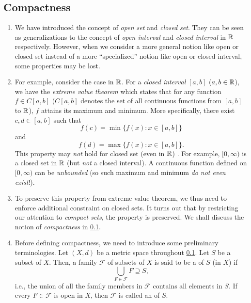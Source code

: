 \subsection{Compactness}
\label{subsect:compactness}
\begin{enumerate}
\item We have introduced the concept of \emph{open set} and \emph{closed set}.
They can be seen as generalizations to the concept of \emph{open interval} and
\emph{closed interval} in \(\mathbb{R}\) respectively. However, when we consider a more
general notion like open or closed set instead of a more ``specialized'' notion
like open or closed interval, some properties may be lost.

\item For example, consider the case in \(\mathbb{R}\). For a \emph{closed interval}
\([a,b]\) (\(a,b\in\mathbb{R}\)), we have the \emph{extreme value theorem} which states
that for any function \(f\in C[a,b]\) (\(C[a,b]\) denotes the set of all
continuous functions from \([a,b]\) to \(\mathbb{R}\)), \(f\) attains its maximum and
minimum. More specifically, there exist \(c,d\in[a,b]\) such that
\[
f(c)=\min\{f(x):x\in [a,b]\}
\]
and
\[
f(d)=\max\{f(x):x\in[a,b]\}.
\]
This property may \emph{not} hold for closed set (even in \(\mathbb{R}\)) \warn{}. For
example, \([0,\infty)\) is a closed set in \(\mathbb{R}\) (but \emph{not} a closed
interval). A continuous function defined on \([0,\infty)\) can be
\emph{unbounded} (so such maximum and minimum \emph{do not even exist}!).

\item To preserve this property from extreme value theorem, we thus need to
enforce additional constraint on closed sets. It turns out that by restricting
our attention to \emph{compact sets}, the property is preserved.  We shall
discuss the notion of \emph{compactness} in \cref{subsect:compactness}.

\item Before defining compactness, we need to introduce some preliminary
terminologies. Let \((X,d)\) be a metric space throughout
\cref{subsect:compactness}. Let \(S\) be a subset of \(X\). Then, a family
\(\mathcal{F}\) of subsets of \(X\) is said to be a  of \(S\) (in
\(X\)) if
\[
\bigcup_{F\in\mathcal{F}}F\supseteq S,
\]
i.e., the union of all the family members in \(\mathcal{F}\) contains all
elements in \(S\). If every \(F\in\mathcal{F}\) is open in \(X\), then
\(\mathcal{F}\) is called an  of \(S\).


\end{enumerate}

